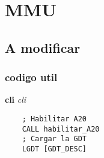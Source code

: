
\section{MMU}
\subsection{A modificar}
\subsubsection{codigo util}
\textbf{cli} \textit{cli}

\begin{codesnippet}
\begin{verbatim}
    ; Habilitar A20
    CALL habilitar_A20
    ; Cargar la GDT
    LGDT [GDT_DESC]
\end{verbatim}
\end{codesnippet}
